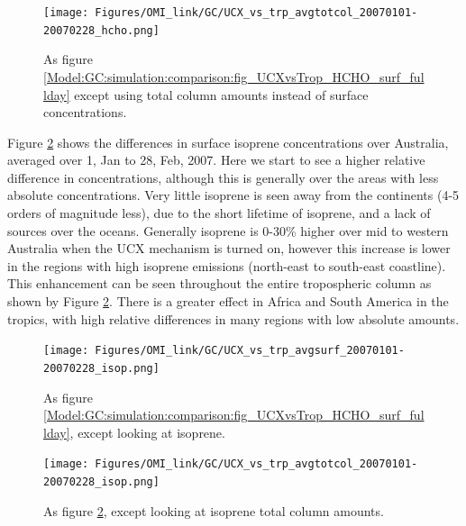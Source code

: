       \begin{figure}
        \texttt{[image: Figures/OMI\_link/GC/UCX\_vs\_trp\_avgtotcol\_20070101-20070228\_hcho.png]}
        \caption{%
          As figure \ref{Model:GC:simulation:comparison:fig_UCXvsTrop_HCHO_surf_fullday} except using total column amounts instead of surface concentrations.
        }
        \label{Model:GC:simulation:comparison:fig_UCXvsTrop_HCHO_totcol_fullday}
      \end{figure}
      

      
      Figure \ref{Model:GC:simulation:comparison:fig_UCXvsTrop_isop_surf_fullday} shows the differences in surface isoprene concentrations over Australia, averaged over 1, Jan to 28, Feb, 2007.
      Here we start to see a higher relative difference in concentrations, although this is generally over the areas with less absolute concentrations. 
      Very little isoprene is seen away from the continents (4-5 orders of magnitude less), due to the short lifetime of isoprene, and a lack of sources over the oceans.
      Generally isoprene is 0-30\% higher over mid to western Australia when the UCX mechanism is turned on, however this increase is lower in the regions with high isoprene emissions (north-east to south-east coastline).
      This enhancement can be seen throughout the entire tropospheric column as shown by Figure \ref{Model:GC:simulation:comparison:fig_UCXvsTrop_isop_surf_fullday}.
      There is a greater effect in Africa and South America in the tropics, with high relative differences in many regions with low absolute amounts.
      
      \begin{figure}
        \texttt{[image: Figures/OMI\_link/GC/UCX\_vs\_trp\_avgsurf\_20070101-20070228\_isop.png]}
        \caption{ %
          As figure \ref{Model:GC:simulation:comparison:fig_UCXvsTrop_HCHO_surf_fullday}, except looking at isoprene. 
        }      
        \label{Model:GC:simulation:comparison:fig_UCXvsTrop_isop_surf_fullday}
      \end{figure}
      \begin{figure}
        \texttt{[image: Figures/OMI\_link/GC/UCX\_vs\_trp\_avgtotcol\_20070101-20070228\_isop.png]}
        \caption{ %
          As figure \ref{Model:GC:simulation:comparison:fig_UCXvsTrop_isop_surf_fullday}, except looking at isoprene total column amounts. 
        }      
        \label{Model:GC:simulation:comparison:fig_UCXvsTrop_isop_totcol_fullday}
      \end{figure}
      
